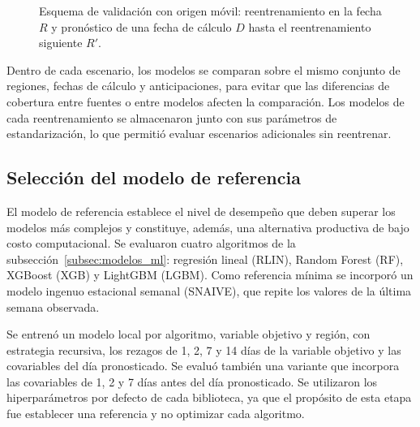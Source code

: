 \begin{figure}[htbp]
{%
	}
	\caption{Esquema de validación con origen móvil: reentrenamiento en la fecha $R$ y pronóstico de una fecha de cálculo $D$ hasta el reentrenamiento siguiente $R'$.}
	\label{fig:esquema_validacion}
\end{figure}

Dentro de cada escenario, los modelos se comparan sobre el mismo conjunto de regiones, fechas de cálculo y anticipaciones, para evitar que las diferencias de cobertura entre fuentes o entre modelos afecten la comparación. Los modelos de cada reentrenamiento se almacenaron junto con sus parámetros de estandarización, lo que permitió evaluar escenarios adicionales sin reentrenar.

\subsection{Selección del modelo de referencia}
\label{subsec:seleccion_baseline}

El modelo de referencia establece el nivel de desempeño que deben superar los modelos más complejos y constituye, además, una alternativa productiva de bajo costo computacional. Se evaluaron cuatro algoritmos de la subsección~\ref{subsec:modelos_ml}: regresión lineal (RLIN), Random Forest (RF), XGBoost (XGB) y LightGBM (LGBM). Como referencia mínima se incorporó un modelo ingenuo estacional semanal (SNAIVE), que repite los valores de la última semana observada.

Se entrenó un modelo local por algoritmo, variable objetivo y región, con estrategia recursiva, los rezagos de 1, 2, 7 y 14 días de la variable objetivo y las covariables del día pronosticado. Se evaluó también una variante que incorpora las covariables de 1, 2 y 7 días antes del día pronosticado. Se utilizaron los hiperparámetros por defecto de cada biblioteca, ya que el propósito de esta etapa fue establecer una referencia y no optimizar cada algoritmo.

